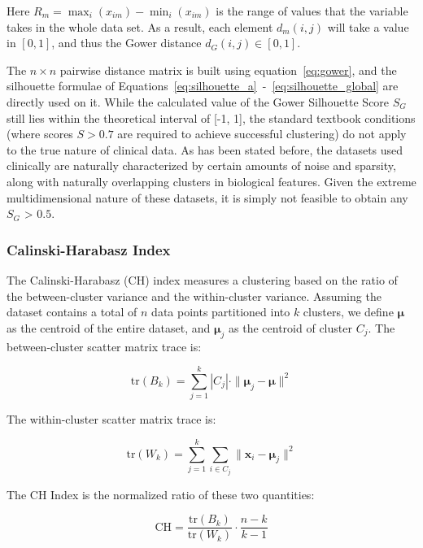 Here $R_m=\max_i(x_{im})-\min_i(x_{im})$ is the range of values that the variable takes in the whole data set. As a result, each element $d_m(i,j)$ will take a value in $[0,1]$, and thus the Gower distance $d_G(i,j)\in[0,1]$.

The $n\times n$ pairwise distance matrix is built using equation~\eqref{eq:gower}, and the silhouette formulae of Equations~\eqref{eq:silhouette_a}~-~\eqref{eq:silhouette_global} are directly used on it. While the calculated value of the Gower Silhouette Score $S_G$ still lies within the theoretical interval of [-1, 1], the standard textbook conditions (where scores $S > 0.7$ are required to achieve successful clustering) do not apply to the true nature of clinical data. As has been stated before, the datasets used clinically are naturally characterized by certain amounts of noise and sparsity, along with naturally overlapping clusters in biological features. Given the extreme multidimensional nature of these datasets, it is simply not feasible to obtain any $S_G$ > $0.5$.

\subsubsection*{Calinski-Harabasz Index}

The Calinski-Harabasz (CH) index \cite{calinski1974} measures a clustering based on the ratio of the between-cluster variance and the within-cluster variance. Assuming the dataset contains a total of $n$ data points partitioned into $k$ clusters, we define $\boldsymbol{\mu}$ as the centroid of the entire dataset, and $\boldsymbol{\mu}_j$ as the centroid of cluster $C_j$. The between-cluster scatter matrix trace is:

\begin{equation}
    \mathrm{tr}(B_k) = \sum_{j=1}^{k} |C_j| \cdot \|\boldsymbol{\mu}_j - \boldsymbol{\mu}\|^2
    \label{eq:ch_between}
\end{equation}

The within-cluster scatter matrix trace is:

\begin{equation}
    \mathrm{tr}(W_k) = \sum_{j=1}^{k} \sum_{i \in C_j} \|\mathbf{x}_i - \boldsymbol{\mu}_j\|^2
    \label{eq:ch_within}
\end{equation}

The CH Index is the normalized ratio of these two quantities:

\begin{equation}
    \mathrm{CH} = \frac{\mathrm{tr}(B_k)}{\mathrm{tr}(W_k)} \cdot \frac{n - k}{k - 1}
    \label{eq:ch}
\end{equation}

